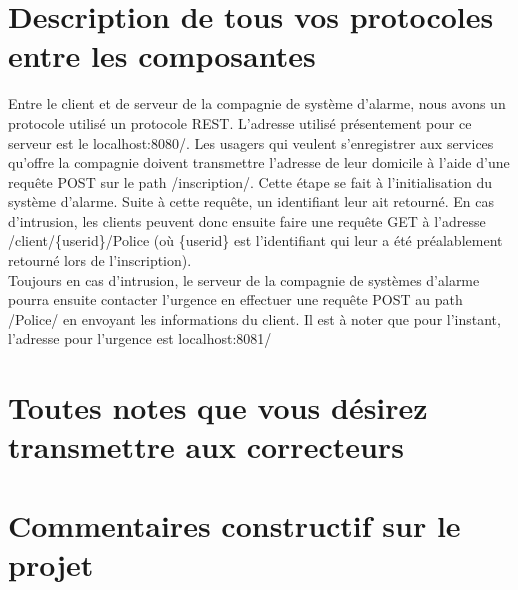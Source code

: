 
\section*{Description de tous vos protocoles entre les composantes}
Entre le client et de serveur de la compagnie de système d'alarme, nous avons un protocole utilisé un protocole REST. L'adresse utilisé présentement pour ce serveur est le localhost:8080/. Les usagers qui veulent s'enregistrer aux services qu'offre la compagnie doivent transmettre l'adresse de leur domicile à l'aide d'une requête POST sur le path /inscription/. Cette étape se fait à l'initialisation du système d'alarme. Suite à cette requête, un identifiant leur ait retourné. En cas d'intrusion, les clients peuvent donc ensuite faire une requête GET à l'adresse /client/\{userid\}/Police (où \{userid\} est l'identifiant qui leur a été préalablement retourné lors de l'inscription). \\

Toujours en cas d'intrusion, le serveur de la compagnie de systèmes d'alarme pourra ensuite contacter l'urgence en effectuer une requête POST au path /Police/ en envoyant les informations du client. Il est à noter que pour l'instant, l'adresse pour l'urgence est localhost:8081/

\section*{Toutes notes que vous désirez transmettre aux correcteurs}

\section*{Commentaires constructif sur le projet}
